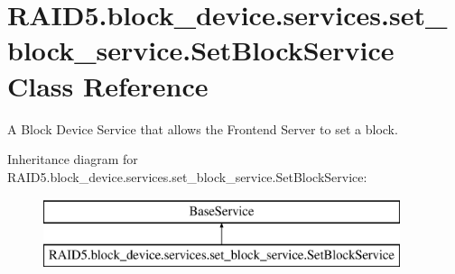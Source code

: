 \hypertarget{class_r_a_i_d5_1_1block__device_1_1services_1_1set__block__service_1_1_set_block_service}{}\section{R\+A\+I\+D5.\+block\+\_\+device.\+services.\+set\+\_\+block\+\_\+service.\+Set\+Block\+Service Class Reference}
\label{class_r_a_i_d5_1_1block__device_1_1services_1_1set__block__service_1_1_set_block_service}


A Block Device Service that allows the Frontend Server to set a block.  


Inheritance diagram for R\+A\+I\+D5.\+block\+\_\+device.\+services.\+set\+\_\+block\+\_\+service.\+Set\+Block\+Service\+:\begin{figure}[H]
\begin{center}
\leavevmode
\includegraphics[height=2.000000cm]{class_r_a_i_d5_1_1block__device_1_1services_1_1set__block__service_1_1_set_block_service}
\end{center}
\end{figure}
